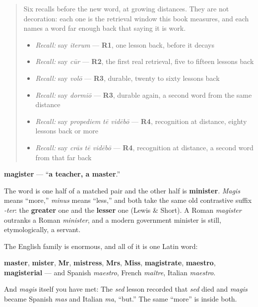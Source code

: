 \label{lesson:LA-C53-magister}



\begin{quote}
Six recalls before the new word, at growing distances. They are not decoration: each one is the retrieval window this book measures, and each names a word far enough back that saying it is work.

\begin{itemize}
\raggedright
  \item \emph{Recall:} say \emph{iterum} — \textbf{R1}, one lesson back, before it decays
  \item \emph{Recall:} say \emph{cūr} — \textbf{R2}, the first real retrieval, five to fifteen lessons back
  \item \emph{Recall:} say \emph{volō} — \textbf{R3}, durable, twenty to sixty lessons back
  \item \emph{Recall:} say \emph{dormiō} — \textbf{R3}, durable again, a second word from the same distance
  \item \emph{Recall:} say \emph{propediem tē vidēbō} — \textbf{R4}, recognition at distance, eighty lessons back or more
  \item \emph{Recall:} say \emph{crās tē vidēbō} — \textbf{R4}, recognition at distance, a second word from that far back
\end{itemize}
\end{quote}

\begin{cousinweb}
\textbf{magister} — \textquotedblleft{}\textbf{a teacher, a master}.\textquotedblright{}

The word is one half of a matched pair and the other half is \textbf{minister}. \emph{Magis} means \textquotedblleft{}more,\textquotedblright{} \emph{minus} means \textquotedblleft{}less,\textquotedblright{} and both take the same old contrastive suffix \emph{-ter}: the \textbf{greater} one and the \textbf{lesser} one (Lewis \& Short). A Roman \emph{magister} outranks a Roman \emph{minister}, and a modern government minister is still, etymologically, a servant.

The English family is enormous, and all of it is one Latin word:

\textbf{master}, \textbf{mister}, \textbf{Mr}, \textbf{mistress}, \textbf{Mrs}, \textbf{Miss}, \textbf{magistrate}, \textbf{maestro}, \textbf{magisterial} — and Spanish \emph{maestro}, French \emph{maître}, Italian \emph{maestro}.

And \emph{magis} itself you have met: The \emph{sed} lesson recorded that \emph{sed} died and \emph{magis} became Spanish \emph{mas} and Italian \emph{ma}, \textquotedblleft{}but.\textquotedblright{} The same \textquotedblleft{}more\textquotedblright{} is inside both.
\end{cousinweb}

